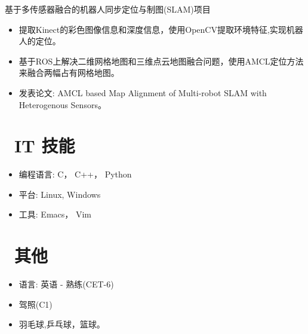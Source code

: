 \documentclass{resume}
\begin{document}
\begin{onehalfspacing}
    基于多传感器融合的机器人同步定位与制图(SLAM)项目
\begin{itemize}
  \item 提取Kinect的彩色图像信息和深度信息，使用OpenCV提取环境特征,实现机器人的定位。
  \item 基于ROS上解决二维网格地图和三维点云地图融合问题，使用AMCL定位方法来融合两幅占有网格地图。
  \item 发表论文: AMCL based Map Alignment of Multi-robot SLAM with Heterogenous Sensors。
\end{itemize}
\end{onehalfspacing}


\section{\faCogs\ IT 技能}
\begin{itemize}[parsep=0.5ex]
  \item 编程语言: C， C++， Python
  \item 平台: Linux, Windows
  \item 工具: Emacs， Vim
\end{itemize}


\section{\faInfo\ 其他}
\begin{itemize}[parsep=0.5ex]
  \item 语言: 英语 - 熟练(CET-6)
  \item 驾照(C1)
  \item 羽毛球,乒乓球，篮球。
\end{itemize}

%
%
\end{document}
